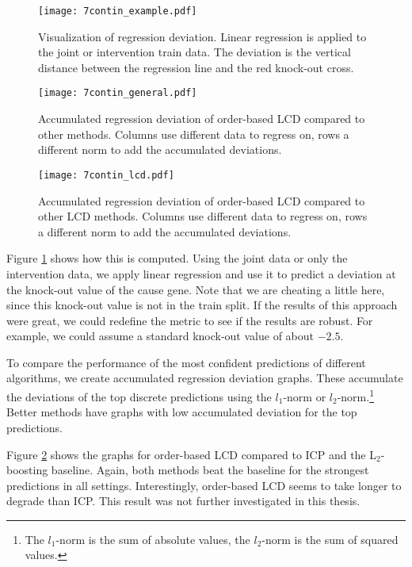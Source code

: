 \begin{figure}[h]
    \centering
    \texttt{[image: 7contin\_example.pdf]}
    \caption{Visualization of regression deviation. Linear regression is applied to the joint or intervention train data. The deviation is the vertical distance between the regression line and the red knock-out cross.}
    \label{fig:7:contex}
\end{figure}

\begin{figure}[p]
    \centering
    \texttt{[image: 7contin\_general.pdf]}
    \caption{Accumulated regression deviation of order-based LCD compared to other methods. Columns use different data to regress on, rows a different norm to add the accumulated deviations.}
    \label{fig:7:congen}
\end{figure}

\begin{figure}[p]
    \centering
    \texttt{[image: 7contin\_lcd.pdf]}
    \caption{Accumulated regression deviation of order-based LCD compared to other LCD methods. Columns use different data to regress on, rows a different norm to add the accumulated deviations.}
    \label{fig:7:conlcd}
\end{figure}

Figure \ref{fig:7:contex} shows how this is computed. Using the joint data or only the intervention data, we apply linear regression and use it to predict a deviation at the knock-out value of the cause gene. Note that we are cheating a little here, since this knock-out value is not in the train split. If the results of this approach were great, we could redefine the metric to see if the results are robust. For example, we could assume a standard knock-out value of about $-2.5$.

To compare the performance of the most confident predictions of different algorithms, we create accumulated regression deviation graphs. These accumulate the deviations of the top discrete predictions using the $l_1$-norm or $l_2$-norm.\footnote{The $l_1$-norm is the sum of absolute values, the $l_2$-norm is the sum of squared values.} Better methods have graphs with low accumulated deviation for the top predictions.

Figure \ref{fig:7:congen} shows the graphs for order-based LCD compared to ICP and the L$_2$-boosting baseline. Again, both methods beat the baseline for the strongest predictions in all settings. Interestingly, order-based LCD seems to take longer to degrade than ICP. This result was not further investigated in this thesis.

